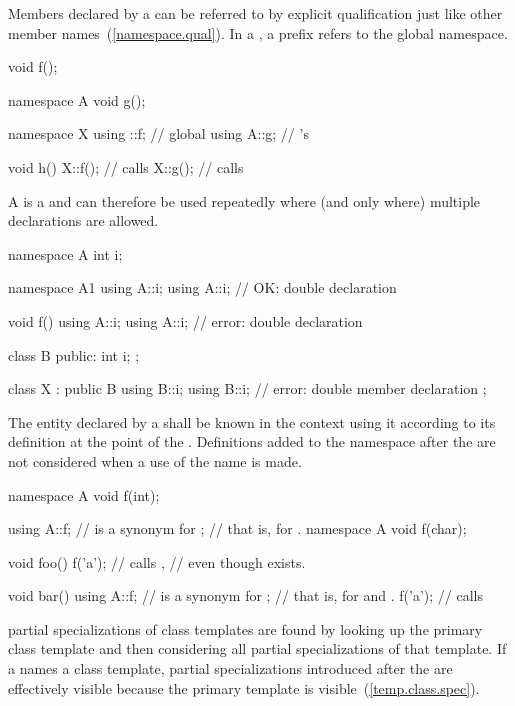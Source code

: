 \pnum
Members declared by a  can be referred to by
explicit qualification just like other member
names~(\ref{namespace.qual}). In a , a
prefix \tcode{::} refers to the global namespace.
\enterexample

\begin{codeblock}
void f();

namespace A {
	void g();
}

namespace X {
	using ::f;		// global 
	using A::g;		// 's 
}

void h()
{
	X::f();			// calls 
	X::g();			// calls 
}
\end{codeblock}
\exitexampleb

\pnum
A  is a  and can
therefore be used repeatedly where (and only where) multiple
declarations are allowed.
\enterexample

\begin{codeblock}
namespace A {
	int i;
}

namespace A1 {
	using A::i;
	using A::i;		// OK: double declaration
}

void f()
{
	using A::i;
	using A::i;		// error: double declaration
}

class B {
public:
	int i;
};

class X : public B {
	using B::i;
	using B::i;		// error: double member declaration
};
\end{codeblock}
\exitexampleb

\pnum
The entity declared by a  shall be known in
the context using it according to its definition at the point of the
. Definitions added to the namespace after
the  are not considered when a use of the
name is made.
\enterexample

\begin{codeblock}
namespace A {
	void f(int);
}

using A::f;			//  is a synonym for ;
				// that is, for .
namespace A {
	void f(char);
}

void foo()
{
	f('a');			// calls ,
}				// even though  exists.

void bar()
{
	using A::f;		//  is a synonym for ;
				// that is, for  and .
	f('a');			// calls 
}
\end{codeblock}
\exitexampleb
\enternote
partial specializations of class templates are found by looking up the
primary class template and then considering all partial specializations
of that template. If a  names a class
template, partial specializations introduced after the
 are effectively visible because the primary
template is visible~(\ref{temp.class.spec}).
\exitnote


